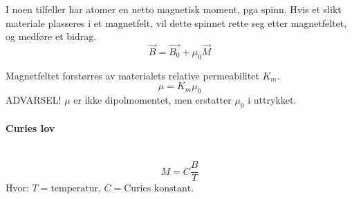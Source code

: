 I noen tilfeller har atomer en netto magnetisk moment, pga spinn.
Hvis et slikt materiale plasseres i et magnetfelt,
vil dette spinnet rette seg etter magnetfeltet, og medføre et bidrag.
$$\vec{B} = \vec{B_0} + \mu_0\vec{M}$$

Magnetfeltet forstørres av materialets relative permeabilitet $K_m$.
$$\mu = K_m\mu_0$$
ADVARSEL! $\mu$ er ikke dipolmomentet, men erstatter $\mu_0$ i uttrykket.



\paragraph{Curies lov} \hfill \\
$$M = C\frac{B}{T}$$
Hvor: $T = \text{temperatur}$, $C = \text{Curies konstant}$.
